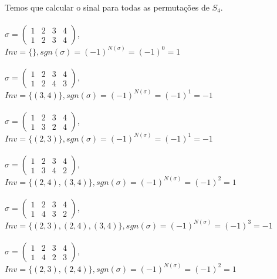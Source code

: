 \documentclass[12pt, a4paper]{article}
\begin{document}
\par Temos que calcular o sinal para todas as permutações de $S_4$.\\
\\
\noindent
$\sigma = \left(\begin{array}{cccc} 1 & 2 & 3 & 4\\ 1 & 2 & 3 & 4 \end{array}\right)$,\\  $Inv = \{\}, sgn(\sigma) = (-1)^{N(\sigma)} = (-1)^0 = 1$\\
\\
\noindent
$\sigma =\left(\begin{array}{cccc} 1 & 2 & 3 & 4\\ 1 & 2 & 4 & 3 \end{array}\right)$,\\ $Inv = \{(3, 4)\}, sgn(\sigma) = (-1)^{N(\sigma)} = (-1)^1 = -1$\\
\\
\noindent
$\sigma =\left(\begin{array}{cccc} 1 & 2 & 3 & 4\\ 1 & 3 & 2 & 4 \end{array}\right)$,\\ $Inv = \{(2,3)\}, sgn(\sigma) = (-1)^{N(\sigma)} = (-1)^1 = -1$\\
\\
\noindent
$\sigma =\left(\begin{array}{cccc} 1 & 2 & 3 & 4\\ 1 & 3 & 4 & 2 \end{array}\right)$,\\ $Inv = \{(2, 4), (3,4)\}, sgn(\sigma) = (-1)^{N(\sigma)} = (-1)^2 = 1$\\
\\
\noindent
$\sigma =\left(\begin{array}{cccc} 1 & 2 & 3 & 4\\ 1 & 4 & 3 & 2 \end{array}\right)$,\\ $Inv = \{(2,3), (2,4), (3, 4)\}, sgn(\sigma) = (-1)^{N(\sigma)} = (-1)^3 = -1$\\
\\
\noindent
$\sigma =\left(\begin{array}{cccc} 1 & 2 & 3 & 4\\ 1 & 4 & 2 & 3 \end{array}\right)$,\\  $Inv = \{(2,3), (2, 4)\}, sgn(\sigma) = (-1)^{N(\sigma)} = (-1)^2 = 1$\\
\end{document}
